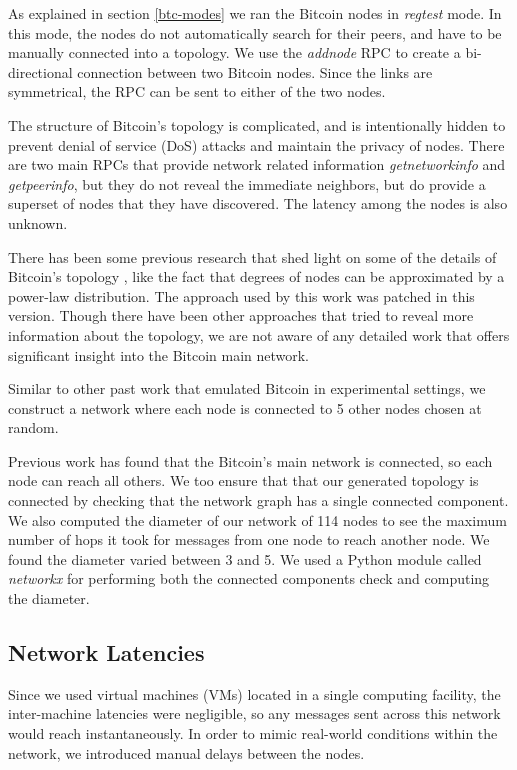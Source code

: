 As explained in section \ref{btc-modes} we ran the Bitcoin nodes in \textit{regtest} mode. In this mode, the nodes do not automatically search for their peers, and have to be manually connected into a topology. We use the \textit{addnode} RPC to create a bi-directional connection between two Bitcoin nodes. Since the links are symmetrical, the RPC can be sent to either of the two nodes. 

The structure of Bitcoin's topology is complicated, and is intentionally hidden to prevent denial of service (DoS) attacks and maintain the privacy of nodes. 
There are two main RPCs that provide network related information \textit{getnetworkinfo} and \textit{getpeerinfo}, but they do not reveal the immediate neighbors, but do provide a superset of nodes that they have discovered. 
The latency among the nodes is also unknown. 

There has been some previous research that shed light on some of the details of Bitcoin's topology \cite{coinscope}, like the fact that degrees of nodes can be approximated by a power-law distribution. The approach used by this work was patched in this version. 
Though there have been other approaches \cite{bitcoinTopology2018} that tried to reveal more information about the topology, we are not aware of any detailed work that offers significant insight into the Bitcoin main network.

Similar to other past work \cite{bitcoinNG} that emulated Bitcoin in experimental settings, we construct a network where each node is connected to 5 other nodes chosen at random.

Previous work \cite{btcmap} has found that the Bitcoin's main network is connected, so each node can reach all others. 
We too ensure that that our generated topology is connected by checking that the network graph has a single connected component.
We also computed the diameter of our network of 114 nodes to see the maximum number of hops it took for messages from one node to reach another node. We found the diameter varied between 3 and 5.
We used a Python module called \textit{networkx} \cite{networkX} for performing both the connected components check and computing the diameter. 

\subsection{Network Latencies} \label{exp-setup-latencies}

Since we used virtual machines (VMs) located in a single computing facility, the inter-machine latencies were negligible, so any messages sent across this network would reach instantaneously. In order to mimic real-world conditions within the network, we introduced manual delays between the nodes.

